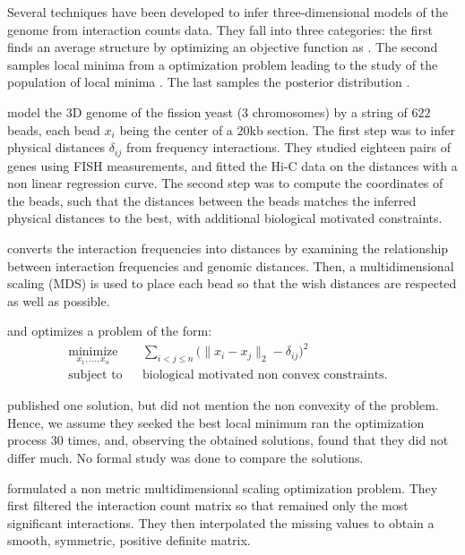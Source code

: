 Several techniques have been developed to infer three-dimensional models of
the genome from interaction counts data. They fall into three categories: the
first finds an average structure by optimizing an objective function as
\citep{tanizawa:mapping, duan:three, ben-elazar:spatial}. The
second samples local minima from a optimization problem leading to the study
of the population of local minima \citep{bau:three-dimensional}. The last
samples the posterior distribution \citep{rousseau:three}.

\citet{tanizawa:mapping} model the 3D genome of the fission yeast (3
chromosomes) by a string of $622$ beads, each bead $x_i$ being the center of a
$20$kb section. The first step was to infer physical distances $\delta_{ij}$
from frequency interactions. They studied eighteen pairs of genes using FISH
measurements, and fitted the Hi-C data on the distances with a non linear
regression curve. The second step was to compute the coordinates of the beads,
such that the distances between the beads matches the inferred physical
distances to the best, with additional biological motivated constraints.

\citet{duan:three} converts the interaction frequencies into distances by
examining the relationship between interaction frequencies and genomic
distances. Then, a multidimensional scaling (MDS) is used to place each bead
so that the wish distances are respected as well as possible.

\citet{tanizawa:mapping} and \citet{duan:three} optimizes a problem of the
form:
\begin{equation*}
\renewcommand{\arraystretch}{2}
\begin{array}{ccll}
\underset{x_1,\ldots, x_n}{\text{minimize}} & &
\underset{i<j\leq n}{\sum} \big(\|x_i - x_j\|_2 - \delta_{ij}\big)^2 &\\
\text{subject to}
& & \text{biological motivated non convex constraints.}
\end{array}
\end{equation*}

\citet{tanizawa:mapping} published one solution, but did not mention the non
convexity of the problem. Hence, we assume they seeked the best local minimum
\citet{duan:three} ran the optimization process 30 times, and, observing the
obtained solutions, found that they did not differ much. No formal study was
done to compare the solutions.

\citet{ben-elazar:spatial} formulated a non metric multidimensional scaling
optimization problem. They first filtered the interaction count matrix so that
remained only the most significant interactions. They then interpolated the
missing values to obtain a smooth, symmetric, positive definite matrix.

